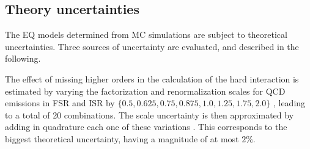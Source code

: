 


\subsection{Theory uncertainties}
\label{subsec:signals:systs:theo}

The \ac{EQ} models determined from \ac{MC} simulations are subject to theoretical uncertainties. Three sources of uncertainty are evaluated, and described in the following.

The effect of missing higher orders in the calculation of the hard interaction is estimated by varying the factorization and renormalization scales for \ac{QCD} emissions in \ac{FSR} and \ac{ISR} by \(\{0.5, 0.625, 0.75, 0.875, 1.0, 1.25, 1.75, 2.0\}\) , leading to a total of 20 combinations. The scale uncertainty is then approximated by adding in quadrature each one of these variations . This corresponds to the biggest theoretical uncertainty, having a magnitude of at most \(2\%\).


